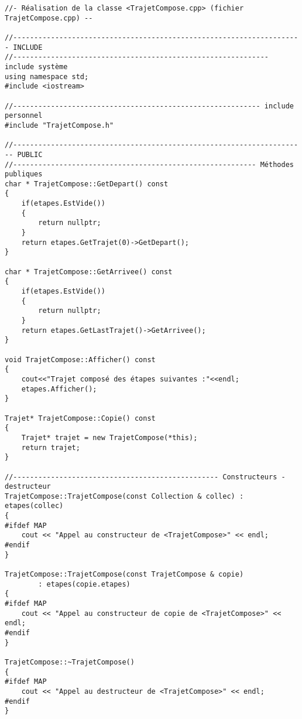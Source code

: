 \begin{verbatim}
//- Réalisation de la classe <TrajetCompose.cpp> (fichier TrajetCompose.cpp) --

//--------------------------------------------------------------------- INCLUDE
//------------------------------------------------------------- include système
using namespace std;
#include <iostream>

//----------------------------------------------------------- include personnel
#include "TrajetCompose.h"

//---------------------------------------------------------------------- PUBLIC
//---------------------------------------------------------- Méthodes publiques
char * TrajetCompose::GetDepart() const
{
    if(etapes.EstVide())
    {
        return nullptr;
    }
    return etapes.GetTrajet(0)->GetDepart();
}

char * TrajetCompose::GetArrivee() const
{
    if(etapes.EstVide())
    {
        return nullptr;
    }
    return etapes.GetLastTrajet()->GetArrivee();
}

void TrajetCompose::Afficher() const
{
    cout<<"Trajet composé des étapes suivantes :"<<endl;
    etapes.Afficher();
}

Trajet* TrajetCompose::Copie() const
{
    Trajet* trajet = new TrajetCompose(*this);
    return trajet;
}

//------------------------------------------------- Constructeurs - destructeur
TrajetCompose::TrajetCompose(const Collection & collec) : etapes(collec)
{
#ifdef MAP
    cout << "Appel au constructeur de <TrajetCompose>" << endl;
#endif
}

TrajetCompose::TrajetCompose(const TrajetCompose & copie)
        : etapes(copie.etapes)
{
#ifdef MAP
    cout << "Appel au constructeur de copie de <TrajetCompose>" << endl;
#endif
}

TrajetCompose::~TrajetCompose()
{
#ifdef MAP
    cout << "Appel au destructeur de <TrajetCompose>" << endl;
#endif
}
\end{verbatim}
